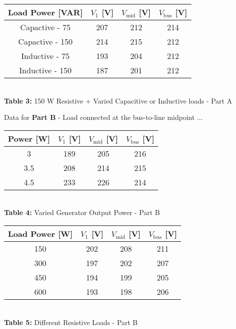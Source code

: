 \documentclass[]{report}
\begin{document}
\begin{table}[h] \centering
	\begin{tabular}{@{}cccc@{}}
		\toprule
		Load Power [VAR] 	& $V_1$ [V] & $V_\text{mid}$  [V]& $V_\text{bus}$ [V] \\ \midrule
		Capactive - 75   	&   207 	&  212    		&  214    		\\
		Capactive - 150  	&  214  	&      215		&      212		\\
		Inductive - 75  	&  193  	&      204		&      212		\\
		Inductive - 150 	&   187 	&  	201    		& 212     		\\ \bottomrule
	\end{tabular} \\ \vspace{1em}
	\textbf{Table 3:} 150 W Resistive + Varied Capacitive or Inductive loads - Part A
\end{table}
\newpage
Data for \textbf{Part B} - Load connected at the bus-to-line midpoint $\ldots$

\begin{table}[h] \centering
	\begin{tabular}{@{}cccc@{}}
		\toprule
		Power [W] 	& $V_1$ [V] & $V_\text{mid}$  [V]& $V_\text{bus}$ [V] \\ \midrule
		3   	&   189 	&  205    		&  216    		\\
		3.5  	&  208  	&      214		&      215		\\
		4.5 	&   233 	&  	226    		& 214      		\\ \bottomrule
	\end{tabular} \\ \vspace{1em}
	\textbf{Table 4:} Varied Generator Output Power - Part B
\end{table}

\begin{table}[h] \centering
	\begin{tabular}{@{}cccc@{}}
		\toprule
		Load Power [W] 	& $V_1$ [V] & $V_\text{mid}$  [V]& $V_\text{bus}$ [V] \\ \midrule
		150   	&   202 	&  208    		&  211    		\\
		300  	&  197  	&      202		&      207		\\
		450  	&  194  	&      199		&      205		\\
		600 	&   193 	&  	198    		& 206     		\\ \bottomrule
	\end{tabular} \\ \vspace{1em}
	\textbf{Table 5:} Different Resistive Loads - Part B
\end{table}
\end{document}
